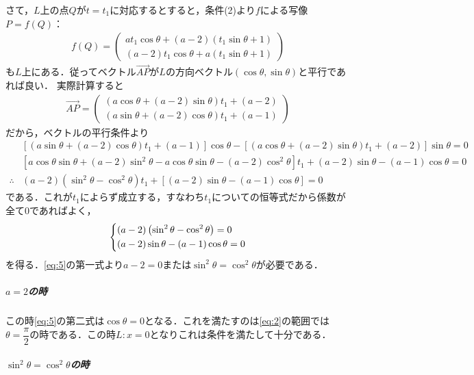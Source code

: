 \documentclass[../../main.tex]{subfiles}
\begin{document}
さて，$L$上の点$Q$が$t=t_1$に対応するとすると，条件(2)より$f$による写像$P=f(Q)$：
\begin{align}
  f(Q) =
  \begin{pmatrix}
    at_1\cos\theta + (a-2)\left(t_1\sin\theta + 1\right) \\
    (a-2)t_1\cos\theta + a\left(t_1\sin\theta + 1\right)
  \end{pmatrix}
\end{align}
も$L$上にある．従ってベクトル$\overrightarrow{AP}$が$L$の方向ベクトル$(\cos\theta,\sin\theta)$と平行であれば良い．
実際計算すると
\begin{align}
  \overrightarrow{AP} =
  \begin{pmatrix}
    \left(a\cos\theta + (a-2)\sin\theta\right) t_1 + (a-2) \\
    \left(a\sin\theta + (a-2)\cos\theta\right) t_1 + (a-1)
  \end{pmatrix} \label{eq:3}
\end{align}
だから，ベクトルの平行条件より
\begin{align}
  & \left[\left(a\sin\theta + (a-2)\cos\theta\right) t_1 + (a-1)\right]\cos\theta - \left[\left(a\cos\theta + (a-2)\sin\theta\right) t_1 + (a-2)\right]\sin\theta = 0 \\
  & \left[a\cos\theta\sin\theta + (a-2)\sin^2\theta -a\cos\theta\sin\theta - (a-2)\cos^2\theta\right]t_1 + (a-2)\sin\theta - (a-1)\cos\theta = 0 \\
  \therefore
  & (a-2)\left(\sin^2\theta -\cos^2\theta\right)t_1 + \left[(a-2)\sin\theta-(a-1)\cos\theta\right] = 0 \label{eq:4}
\end{align}
である．これが$t_1$によらず成立する，すなわち$t_1$についての恒等式だから係数が全て$0$であればよく，
\begin{align}
  \begin{dcases}
    (a-2)\left(\sin^2\theta -\cos^2\theta\right) = 0 \\
    (a-2)\sin\theta-(a-1)\cos\theta = 0
  \end{dcases} \label{eq:5}
\end{align}
を得る．\cref{eq:5}の第一式より$a-2=0$または$\sin^2\theta=\cos^2\theta$が必要である．

\subparagraph{$a=2$の時}
この時\cref{eq:5}の第二式は$\cos\theta=0$となる．これを満たすのは\cref{eq:2}の範囲では$\theta=\dfrac{\pi}{2}$の時である．この時$L:x=0$となりこれは条件を満たして十分である．

\subparagraph{$\sin^2\theta=\cos^2\theta$の時}
\end{document}

